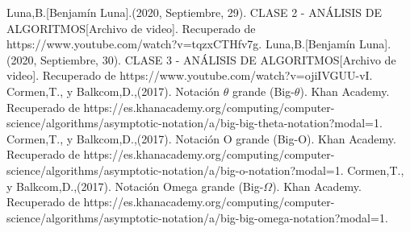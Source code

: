 \documentclass{report}
\begin{document}
\begin{thebibliography}{X}
    Luna,B.[Benjamín Luna].(2020, Septiembre, 29). CLASE 2 - ANÁLISIS DE ALGORITMOS[Archivo de video]. Recuperado de https://www.youtube.com/watch?v=tqzxCTHfv7g.
    Luna,B.[Benjamín Luna].(2020, Septiembre, 30). CLASE 3 - ANÁLISIS DE ALGORITMOS[Archivo de video]. Recuperado de https://www.youtube.com/watch?v=ojiIVGUU-vI.
   Cormen,T., y Balkcom,D.,(2017). Notación $\theta$ grande (Big-$\theta$). Khan Academy. Recuperado de https://es.khanacademy.org/computing/computer-science/algorithms/asymptotic-notation/a/big-big-theta-notation?modal=1.
   Cormen,T., y Balkcom,D.,(2017). Notación O grande (Big-O). Khan Academy. Recuperado de https://es.khanacademy.org/computing/computer-science/algorithms/asymptotic-notation/a/big-o-notation?modal=1.
   Cormen,T., y Balkcom,D.,(2017). Notación Omega grande (Big-$\Omega$). Khan Academy. Recuperado de https://es.khanacademy.org/computing/computer-science/algorithms/asymptotic-notation/a/big-big-omega-notation?modal=1. 
\end{thebibliography}
\end{document}
